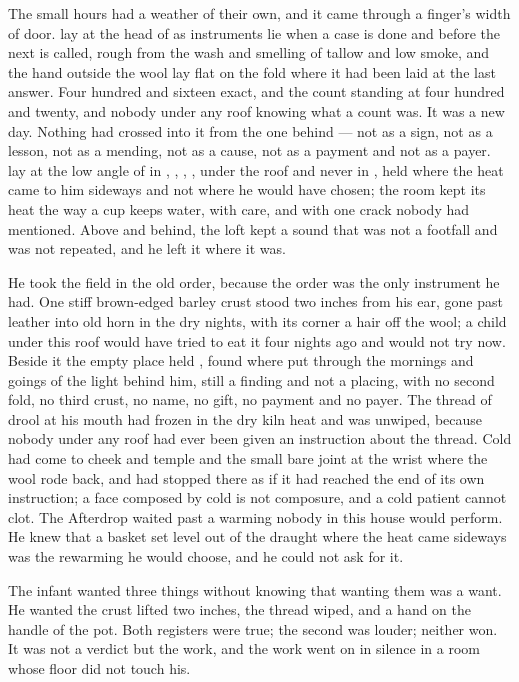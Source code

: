 
The small hours had a weather of their own, and it came through a finger's width of door.  lay at the head of  as instruments lie when a case is done and before the next is called, rough from the wash and smelling of tallow and low smoke, and the hand outside the wool lay flat on the fold where it had been laid at the last answer. Four hundred and sixteen exact, and the count standing at four hundred and twenty, and nobody under any roof knowing what a count was. It was a new day. Nothing had crossed into it from the one behind --- not as a sign, not as a lesson, not as a mending, not as a cause, not as a payment and not as a payer.  lay at the low angle of  in , , , , under the roof and never in , held where the heat came to him sideways and not where he would have chosen; the room kept its heat the way a cup keeps water, with care, and with one crack nobody had mentioned. Above and behind, the loft kept a sound that was not a footfall and was not repeated, and he left it where it was.

He took the field in the old order, because the order was the only instrument he had. One stiff brown-edged barley crust stood two inches from his ear, gone past leather into old horn in the dry nights, with its corner a hair off the wool; a child under this roof would have tried to eat it four nights ago and would not try now. Beside it the empty place held , found where put through the mornings and goings of the light behind him, still a finding and not a placing, with no second fold, no third crust, no name, no gift, no payment and no payer. The thread of drool at his mouth had frozen in the dry kiln heat and was unwiped, because nobody under any roof had ever been given an instruction about the thread. Cold had come to cheek and temple and the small bare joint at the wrist where the wool rode back, and had stopped there as if it had reached the end of its own instruction; a face composed by cold is not composure, and a cold patient cannot clot. The Afterdrop waited past a warming nobody in this house would perform. He knew that a basket set level out of the draught where the heat came sideways was the rewarming he would choose, and he could not ask for it.

The infant wanted three things without knowing that wanting them was a want. He wanted the crust lifted two inches, the thread wiped, and a hand on the handle of the pot. Both registers were true; the second was louder; neither won. It was not a verdict but the work, and the work went on in silence in a room whose floor did not touch his.

